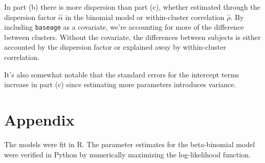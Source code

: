 \documentclass[11pt, letterpaper]{article}
\begin{document}
\begin{enumerate}[(a)]
\begin{description}
  In part (b) there is more dispersion than part (c), whether estimated through
  the dispersion factor $\hat{\alpha}$ in the binomial model or within-cluster
  correlation $\hat{\rho}$. By including \texttt{baseage} as a covariate, we're
  accounting for more of the difference between clusters. Without the covariate,
  the differences between subjects is either accounted by the dispersion factor
  or explained away by within-cluster correlation.

  It's also somewhat notable that the standard errors for the intercept terms
  increase in part (c) since estimating more parameters introduces variance.
\end{description}
\end{enumerate}

\section*{Appendix}

The models were fit in R. The parameter estimates for the beta-binomial model
were verified in Python by numerically maximizing the log-likelihood function.



\end{document}
